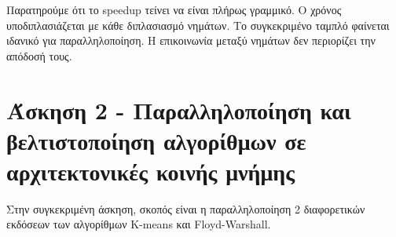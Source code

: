 \documentclass[letterpaper,12pt]{article}
\begin{document}
Παρατηρούμε ότι το speedup τείνει να είναι πλήρως γραμμικό. Ο χρόνος υποδιπλασιάζεται με κάθε διπλασιασμό νημάτων. Το συγκεκριμένο ταμπλό φαίνεται ιδανικό για παραλληλοποίηση. Η επικοινωνία μεταξύ νημάτων δεν περιορίζει την απόδοσή τους.




\section{Άσκηση 2 - Παραλληλοποίηση και βελτιστοποίηση αλγορίθμων σε αρχιτεκτονικές κοινής μνήμης}

Στην συγκεκριμένη άσκηση, σκοπός είναι η παραλληλοποίηση 2 διαφορετικών εκδόσεων των αλγορίθμων K-means και Floyd-Warshall. \
\end{document}
